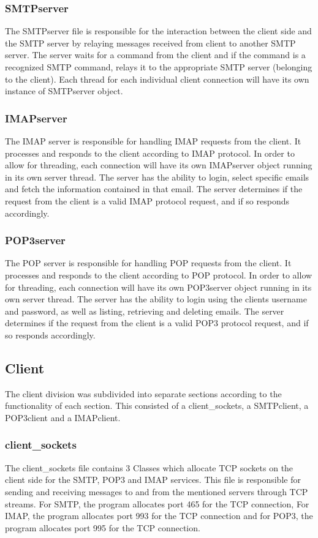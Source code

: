 \documentclass[11pt]{article}
\begin{document}
\begin{multicols}{2}
\subsubsection{SMTPserver}
The SMTPserver file is responsible for the interaction between the client side and the SMTP server by relaying messages received from client to another SMTP server. The server waits for a command from the client and if the command is a recognized SMTP command, relays it to the appropriate SMTP server (belonging to the client). Each thread for each individual client connection will have its own instance of SMTPserver object.
\subsubsection{IMAPserver}
The IMAP server is responsible for handling IMAP requests from the client. It processes and responds to the client according to IMAP protocol. In order to allow for threading, each connection will have its own IMAPserver object running in its own server thread. The server has the ability to login, select specific emails and fetch the information contained in that email. The server determines if the request from the client is a valid IMAP protocol request, and if so responds accordingly.
\subsubsection{POP3server}
The POP server is responsible for handling POP requests from the client. It processes and responds to the client according to POP protocol. In order to allow for threading, each connection will have its own POP3server object running in its own server thread. The server has the ability to login using the clients username and password, as well as listing, retrieving and deleting emails. The server determines if the request from the client is a valid POP3 protocol request, and if so responds accordingly.
\subsection{Client}
The client division was subdivided into separate sections according to the functionality of each section. This consisted of a client\_sockets, a SMTPclient, a POP3client and a IMAPclient.
\subsubsection{client\_sockets}
The client\_sockets file contains 3 Classes which allocate TCP sockets on the client side for the SMTP, POP3 and IMAP services. This file is responsible for sending and receiving messages to and from the mentioned servers through TCP streams. For SMTP, the program allocates port 465 for the TCP connection, For IMAP, the program allocates port 993 for the TCP connection and for POP3, the program allocates port 995 for the TCP connection.

\end{multicols}
\end{document}
